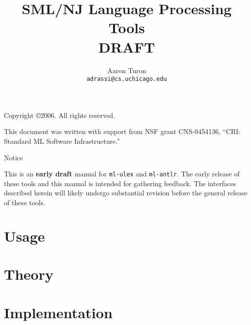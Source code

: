 \documentclass[11pt]{book}
\title{SML/NJ Language Processing Tools\\
DRAFT}
\author{Aaron Turon\\
\texttt{adrassi@cs.uchicago.edu}}
\newcommand{\parttext}{}
\newcommand{\cpart}[1]{\renewcommand{\parttext}{#1}\part{#1}}
\begin{document}
\frontmatter

	\maketitle
	
	\phantom{.}
	
	\noindent Copyright \copyright{}2006.  All rights reserved.
	
	\vskip 12pt
	\noindent This document was written with support from NSF grant CNS-0454136, ``CRI: Standard ML Software Infrastructure.''
	
	\pagebreak
	
	\tableofcontents

\mainmatter

	\renewcommand{\chaptermark}[1]{\markboth{#1}{}}
	\renewcommand{\sectionmark}[1]{\markright{\thesection. \ #1}{}}

    \newpage
    \phantom{.}
	\vskip 72pt
	\begin{center}
	{\Huge Notice}
	\end{center}
	\vskip 20pt \noindent
	{\Large This is an \textbf{early draft} manual for {\tt ml-ulex} and {\tt ml-antlr}.  The early release of these tools and this manual is intended for gathering feedback.  The interfaces described herein will likely undergo substantial revision before the general release of these tools.}
	
	\newpage

	
	
	\renewcommand{\chaptermark}[1]{\markboth{\parttext{}: #1}{}}

	\cpart{Usage}
	
		
		
	
	\cpart{Theory}
	
%		
		

	\cpart{Implementation}

%		
		

\backmatter

	
	
\end{document}
